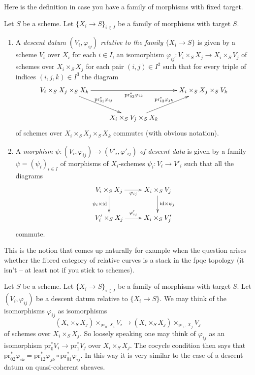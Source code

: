 \noindent
Here is the definition in case you have a family of morphisms
with fixed target.

\begin{definition}
\label{definition-descent-datum-for-family-of-morphisms}
Let $S$ be a scheme.
Let $\{X_i \to S\}_{i \in I}$ be a family of morphisms with target $S$.
\begin{enumerate}
\item A {\it descent datum $(V_i, \varphi_{ij})$ relative to the
family $\{X_i \to S\}$} is given by a scheme $V_i$ over $X_i$
for each $i \in I$, an isomorphism
$\varphi_{ij} : V_i\times_S X_j \to X_i \times_S V_j$
of schemes over $X_i \times_S X_j$ for each pair $(i, j) \in I^2$
such that for every triple of indices $(i, j, k) \in I^3$
the diagram
$$
\xymatrix{
V_i \times_S X_j \times_S X_k
\ar[rd]^{\text{pr}_{01}^*\varphi_{ij}}
\ar[rr]_{\text{pr}_{02}^*\varphi_{ik}} &
&
X_i \times_S X_j \times_S V_k\\
&
X_i \times_S V_j \times_S X_k
\ar[ru]^{\text{pr}_{12}^*\varphi_{jk}}
}
$$
of schemes over $X_i \times_S X_j \times_S X_k$ commutes
(with obvious notation).
\item A {\it morphism
$\psi : (V_i, \varphi_{ij}) \to (V'_i, \varphi'_{ij})$
of descent data} is given by a family
$\psi = (\psi_i)_{i \in I}$ of morphisms of
$X_i$-schemes $\psi_i : V_i \to V'_i$ such that all the diagrams
$$
\xymatrix{
V_i \times_S X_j \ar[r]_{\varphi_{ij}} \ar[d]_{\psi_i \times \text{id}} &
X_i \times_S V_j \ar[d]^{\text{id} \times \psi_j} \\
V'_i \times_S X_j \ar[r]^{\varphi'_{ij}} & X_i \times_S V'_j
}
$$
commute.
\end{enumerate}
\end{definition}

\noindent
This is the notion that comes up naturally for example when the question arises
whether the fibred category of relative curves is a stack in the
fpqc topology (it isn't -- at least not if you stick to schemes).

\begin{remark}
\label{remark-easier-family}
Let $S$ be a scheme.
Let $\{X_i \to S\}_{i \in I}$ be a family of morphisms with target $S$.
Let $(V_i, \varphi_{ij})$ be a descent datum relative to
$\{X_i \to S\}$. We may think of the isomorphisms $\varphi_{ij}$
as isomorphisms
$$
(X_i \times_S X_j) \times_{\text{pr}_0, X_i} V_i
\longrightarrow
(X_i \times_S X_j) \times_{\text{pr}_1, X_j} V_j
$$
of schemes over $X_i \times_S X_j$. So loosely speaking one may
think of $\varphi_{ij}$ as an isomorphism
$\text{pr}_0^*V_i \to \text{pr}_1^*V_j$ over $X_i \times_S X_j$.
The cocycle condition then says that
$\text{pr}_{02}^*\varphi_{ik} =
\text{pr}_{12}^*\varphi_{jk} \circ \text{pr}_{01}^*\varphi_{ij}$.
In this way it is very similar to the case of a descent datum on
quasi-coherent sheaves.
\end{remark}

